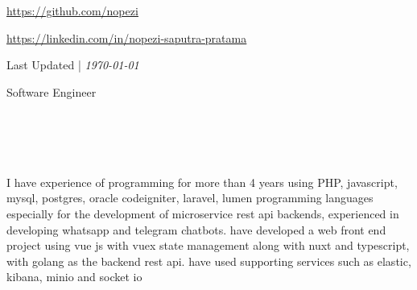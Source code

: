 \begin{multicols}{2}
        {\color{LinkedInBlue} } 
        {
        \href{https://github.com/nopezi}
        {\color{OuterSpace} \underline{https://github.com/nopezi}}
        }
    
        {\color{LinkedInBlue} }
        {
        \href{https://www.linkedin.com/in/nopezi-saputra-pratama/}
        {\color{OuterSpace} \underline{https://linkedin.com/in/nopezi-saputra-pratama}}
        }
    
    \columnbreak
    
        {\hfill \small \color{OuterSpace} Last Updated | \it \today}

    \vspace{0.41in}
    {\color{LinkedInBlue}
    {\large Software Engineer}\\
    \\
    \\
    \\
    \\
    }
    
\end{multicols}

\vspace{0.06in}
I have experience of programming for more than 4 years using PHP, javascript, mysql, postgres, oracle codeigniter, laravel, lumen programming languages especially for the development of microservice rest api backends, experienced in developing whatsapp and telegram chatbots. have developed a web front end project using vue js with vuex state management along with nuxt and typescript, with golang as the backend rest api. have used supporting services such as elastic, kibana, minio and socket io
\vspace{0.2in}
